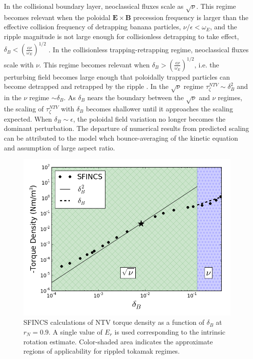 \documentclass{article}
\begin{document}
In the collisional boundary layer, neoclassical fluxes scale as $\sqrt{\nu}$. This regime becomes relevant when the poloidal $\bm{E} \times \bm{B}$ precession frequency is larger than the effective collision frequency of detrapping banana particles, $\nu/\epsilon < \omega_E$, and the ripple magnitude is not large enough for collisionless detrapping to take effect, $\delta_B < \left( \frac{ \epsilon \nu}{\omega_E} \right)^{1/2}$ \cite{Shaing2008}. 
In the collisionless trapping-retrapping regime, neoclassical fluxes scale with $\nu$. This regime becomes relevant when $\delta_B > \left( \frac{ \epsilon \nu}{\omega_E} \right)^{1/2}$, i.e. the perturbing field becomes large enough that poloidally trapped particles can become detrapped and retrapped by the ripple \cite{Shaing2010}. In the $\sqrt{\nu}$ regime $\tau_{\zeta}^{NTV} \sim \delta_B^2$ and in the $\nu$ regime $\sim \delta_B$. As $\delta_B$ nears the boundary between the $\sqrt{\nu}$ and $\nu$ regimes, the scaling of $\tau_{\zeta}^{NTV}$ with $\delta_B$ becomes shallower until it approaches the scaling expected. When $\delta_B \sim \epsilon$, the poloidal field variation no longer becomes the dominant perturbation. The departure of numerical results from predicted scaling can be attributed to the model whch bounce-averaging of the kinetic equation and assumption of large aspect ratio. 

\begin{figure}[h!]
\centering
\includegraphics[width=1\textwidth]
{scalescan.png}
\caption{\label{fig:scalescan} SFINCS calculations of NTV torque density as a function of $\delta_B$ at $r_N = 0.9$. A single value of $E_r$ is used corresponding to the intrinsic rotation estimate. Color-shaded area indicates the approximate regions of applicability for rippled tokamak regimes.}
\end{figure}
\end{document}
